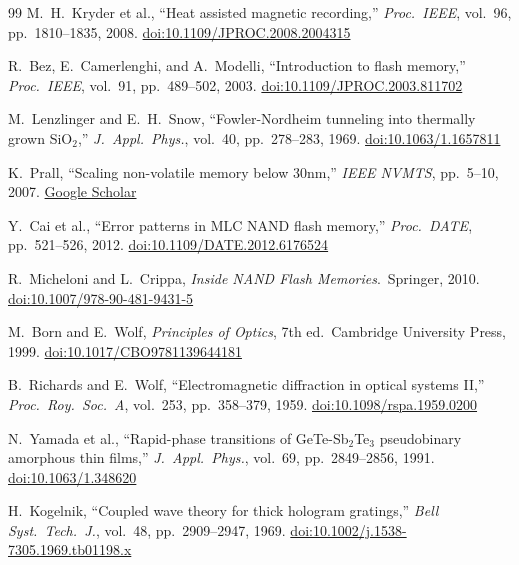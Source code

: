 \documentclass[11pt,a4paper,openany]{book}
\theoremstyle{definition}
\theoremstyle{plain}
\theoremstyle{remark}
\begin{document}
\begin{thebibliography}{99}
M.~H.~Kryder et al., ``Heat assisted magnetic recording,''
\textit{Proc.\ IEEE}, vol.\ 96, pp.\ 1810--1835, 2008.
\href{https://doi.org/10.1109/JPROC.2008.2004315}{doi:10.1109/JPROC.2008.2004315}

R.~Bez, E.~Camerlenghi, and A.~Modelli, ``Introduction to flash memory,''
\textit{Proc.\ IEEE}, vol.\ 91, pp.\ 489--502, 2003.
\href{https://doi.org/10.1109/JPROC.2003.811702}{doi:10.1109/JPROC.2003.811702}

M.~Lenzlinger and E.~H.~Snow, ``Fowler-Nordheim tunneling into
thermally grown SiO$_2$,''
\textit{J.\ Appl.\ Phys.}, vol.\ 40, pp.\ 278--283, 1969.
\href{https://doi.org/10.1063/1.1657811}{doi:10.1063/1.1657811}

K.~Prall, ``Scaling non-volatile memory below 30nm,''
\textit{IEEE NVMTS}, pp.\ 5--10, 2007.
\href{https://scholar.google.com/scholar?q=Prall+scaling+non-volatile+memory+below+30nm}{Google Scholar}

Y.~Cai et al., ``Error patterns in MLC NAND flash memory,''
\textit{Proc.\ DATE}, pp.\ 521--526, 2012.
\href{https://doi.org/10.1109/DATE.2012.6176524}{doi:10.1109/DATE.2012.6176524}

R.~Micheloni and L.~Crippa, \textit{Inside NAND Flash Memories}.\
Springer, 2010.
\href{https://doi.org/10.1007/978-90-481-9431-5}{doi:10.1007/978-90-481-9431-5}

M.~Born and E.~Wolf, \textit{Principles of Optics}, 7th ed.\
Cambridge University Press, 1999.
\href{https://doi.org/10.1017/CBO9781139644181}{doi:10.1017/CBO9781139644181}

\bibitem{richards59}
B.~Richards and E.~Wolf, ``Electromagnetic diffraction in optical
systems II,''
\textit{Proc.\ Roy.\ Soc.\ A}, vol.\ 253, pp.\ 358--379, 1959.
\href{https://doi.org/10.1098/rspa.1959.0200}{doi:10.1098/rspa.1959.0200}

\bibitem{yamada91}
N.~Yamada et al., ``Rapid-phase transitions of GeTe-Sb$_2$Te$_3$
pseudobinary amorphous thin films,''
\textit{J.\ Appl.\ Phys.}, vol.\ 69, pp.\ 2849--2856, 1991.
\href{https://doi.org/10.1063/1.348620}{doi:10.1063/1.348620}

H.~Kogelnik, ``Coupled wave theory for thick hologram gratings,''
\textit{Bell Syst.\ Tech.\ J.}, vol.\ 48, pp.\ 2909--2947, 1969.
\href{https://doi.org/10.1002/j.1538-7305.1969.tb01198.x}{doi:10.1002/j.1538-7305.1969.tb01198.x}


\end{thebibliography}
\end{document}
